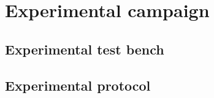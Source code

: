 %
%
\chapter{Experimental campaign}
\label{ch:experimental}

\section{Experimental test bench}
\label{sec:test-bench}
%
%

\section{Experimental protocol}
\label{sec:protocol}
%
%

